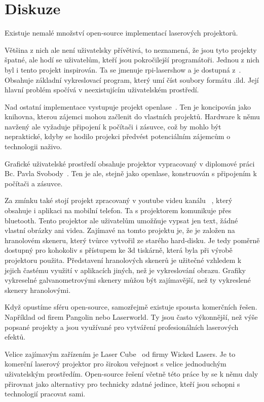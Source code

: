 \chapter{Diskuze}

Existuje nemalé množství open-source implementací laserových projektorů.

Většina z nich ale není uživatelsky přívětivá, to neznamená, že jsou tyto projekty špatné, ale hodí se uživatelům, kteří jsou pokročilejší programátoři. 
Jednou z nich byl i tento projekt inspirován.
Ta se jmenuje rpi-lasershow a je dostupná z~\cite{rpi-lasershow}. Obsahuje základní vykreslovací program, který umí číst soubory formátu .ild. Její hlavní problém spočívá v neexistujícím uživatelském prostředí.

Nad ostatní implementace vystupuje projekt openlase~\cite{openlase}. Ten je koncipován jako knihovna, kterou zájemci mohou začlenit do vlastních projektů.
Hardware k němu navžený ale vyžaduje připojení k počítači i zásuvce, což by mohlo být nepraktické, kdyby se hodilo projekci předvést potenciálním zájemcům o technologii naživo.

Grafické uživatelské prostředí obsahuje projektor vypracovaný v diplomové práci Bc. Pavla Svobody~\cite{vut-chabr}. Ten je ale, stejně jako openlase, konstruován s připojením k počítači a zásuvce.

Za zmínku také stojí projekt zpracovaný v youtube videu kanálu ~\cite{harddrive-projector-youtube}, který obsahuje i aplikaci na mobilní telefon. Ta s projektorem komunikuje přes bluetooth. Tento projektor ale uživatelům umožňuje vypsat jen text, žádné vlastní obrázky ani videa.
Zajímavé na tomto projektu je, že je založen na hranolovém skeneru, který tvůrce vytvořil ze starého hard-disku. Je tedy poměrně dostupný pro kohokoliv s přístupem ke 3d tiskárně, která byla při výrobě projektoru použita.
Představení hranolových skenerů je užitečné vzhledem k jejich častému využití v aplikacích jiných, než je vykreslování obrazu. Grafiky vykreselné galvanometrovými skenery můžou být zajímavější, než ty vykreslené skenery hranolovými.

Když opustíme sféru open-source, samozřejmě existuje spousta komerčních řešen. Například od firem Pangolin nebo Laserworld. Ty jsou často výkonnější, než výše popsané projekty a jsou využívané pro vytváření profesionálních laserových efektů.

Velice zajímavým zařízením je Laser Cube~\cite{lasercube} od firmy Wicked Lasers. Je to komerční laserový projektor pro širokou veřejnost s velice jednoduchým uživatelským prostředím. Open-source řešení včetně této práce by se k němu daly přirovnat jako alternativy pro technicky zdatné jedince, kteří jsou schopni s technologií pracovat sami.
